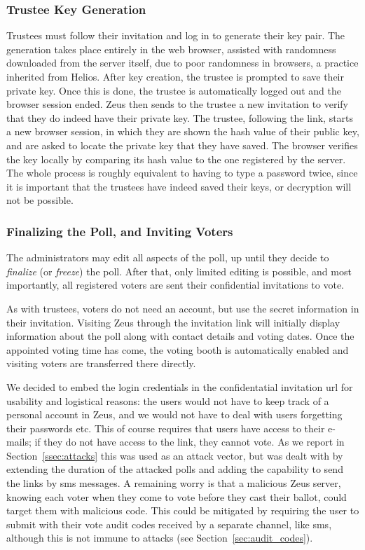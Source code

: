 \documentclass[letterpaper,10pt]{article}
\begin{document}
\subsubsection{Trustee Key Generation}
Trustees must follow their invitation and log in to generate their key
pair. The generation takes place entirely in the web browser, assisted
with randomness downloaded from the server itself, due to poor
randomness in browsers, a practice inherited from Helios. After key
creation, the trustee is prompted to save their private key. Once this
is done, the trustee is automatically logged out and the browser
session ended. Zeus then sends to the trustee a new invitation to
verify that they do indeed have their private key. The trustee,
following the link, starts a new browser session, in which they are
shown the hash value of their public key, and are asked to
locate the private key that they have saved. The browser verifies
the key locally by comparing its hash value to the one registered by
the server. The whole process is roughly equivalent to having to type
a password twice, since it is important that the trustees have indeed
saved their keys, or decryption will not be possible.

\subsubsection{Finalizing the Poll, and Inviting Voters}
The administrators may edit all aspects of the poll, up until they
decide to \emph{finalize} (or \emph{freeze}) the poll.
After that, only limited editing is possible, and most importantly,
all registered voters are sent their confidential invitations to vote.

As with trustees, voters do not need an account, but use the secret
information in their invitation.
Visiting Zeus through the invitation link will initially display
information about the poll along with contact details and voting dates.
Once the appointed voting time has come, the voting booth is
automatically enabled and visiting voters are transferred there directly.

We decided to embed the login credentials in the confidentatial
invitation {\sc url} for usability and logistical reasons: the users
would not have to keep track of a personal account in Zeus, and we
would not have to deal with users forgetting their passwords etc. This
of course requires that users have access to their e-mails; if they do
not have access to the link, they cannot vote. As we report in
Section~\ref{ssec:attacks} this was used as an attack vector, but was
dealt with by extending the duration of the attacked polls and adding
the capability to send the links by {\sc sms} messages. A remaining
worry is that a malicious Zeus server, knowing each voter when they
come to vote before they cast their ballot, could target them with
malicious code. This could be mitigated by requiring the user to
submit with their vote audit codes received by a separate channel,
like {\sc sms}, although this is not immune to attacks
(see Section~\ref{sec:audit_codes}).
\end{document}
